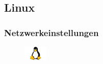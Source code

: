 \documentclass[a4paper,12pt]{scrartcl}
\begin{document}
\pagebreak

\subsection{Linux}

\subsubsection*{Netzwerkeinstellungen}

\begin{figure}[h]
	\raggedleft
	\vspace{-35pt}
	\includegraphics[height=0.7cm,keepaspectratio]{Bilder/linux_logo_neu}
	\vspace{-20pt}
\end{figure}
\end{document}
